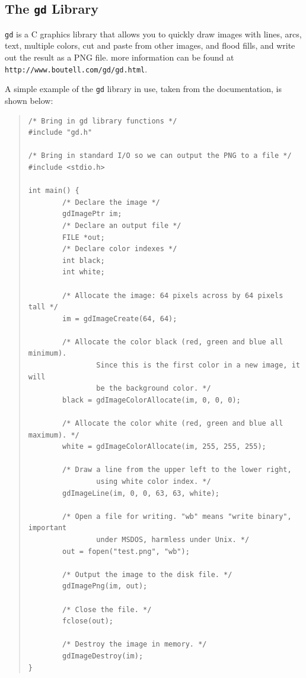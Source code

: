 \documentclass[twoside,11pt]{article}
\newcommand{\htmladdnormallink}[2]{#1}
\newcommand{\htmlref}[2]{#1}
\newcommand{\latex}[1]{#1}
\newcommand{\xlabel}[1]{}
\begin{document}
\subsection{\xlabel{sc15_gd}The {\tt gd} Library\label{sc15_gd}}

\htmladdnormallink{{\tt gd}}{http://www.boutell.com/gd/gd.html} is a C
graphics library that allows you to quickly draw images with lines,
arcs, text, multiple colors, cut and paste from other images, and
flood fills, and write out the result as a \htmlref{PNG}{sc15_libpng}
file.\latex{ more information can be found at {\tt
http://www.boutell.com/gd/gd.html}.}

A simple example of the {\tt gd} library in use, taken from the
documentation, is shown below:

\small
\begin{quote}
\begin{verbatim}
/* Bring in gd library functions */
#include "gd.h"

/* Bring in standard I/O so we can output the PNG to a file */
#include <stdio.h>

int main() {
        /* Declare the image */
        gdImagePtr im;
        /* Declare an output file */
        FILE *out;
        /* Declare color indexes */
        int black;
        int white;

        /* Allocate the image: 64 pixels across by 64 pixels tall */
        im = gdImageCreate(64, 64);

        /* Allocate the color black (red, green and blue all minimum).
                Since this is the first color in a new image, it will
                be the background color. */
        black = gdImageColorAllocate(im, 0, 0, 0);

        /* Allocate the color white (red, green and blue all maximum). */
        white = gdImageColorAllocate(im, 255, 255, 255);

        /* Draw a line from the upper left to the lower right,
                using white color index. */
        gdImageLine(im, 0, 0, 63, 63, white);

        /* Open a file for writing. "wb" means "write binary", important
                under MSDOS, harmless under Unix. */
        out = fopen("test.png", "wb");

        /* Output the image to the disk file. */
        gdImagePng(im, out);

        /* Close the file. */
        fclose(out);

        /* Destroy the image in memory. */
        gdImageDestroy(im);
}
\end{verbatim}
\end{quote}
\normalsize
\end{document}
